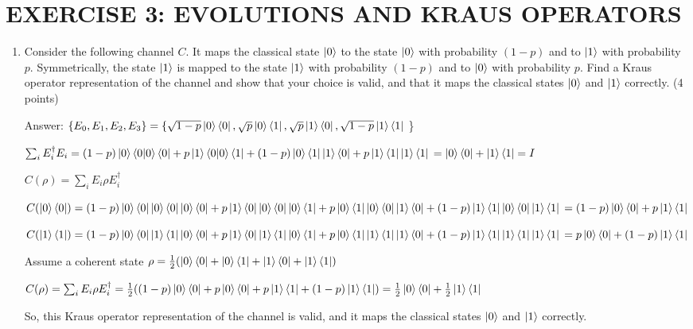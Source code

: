 \documentclass{article}
\begin{document}
\section{EXERCISE 3: EVOLUTIONS AND KRAUS OPERATORS}
\begin{enumerate}
    \item Consider the following channel $C$. It maps the classical state $\ket{0}$ to the state $\ket{0}$ with probability $(1-p)$ and to $\ket{1}$ with probability $p$. Symmetrically, the state $\ket{1}$ is mapped to the state $\ket{1}$ with probability $(1-p)$ and to $\ket{0}$ with probability $p$. Find a Kraus operator representation of the channel and show that your choice is valid, and that it maps the classical states $\ket{0}$ and $\ket{1}$ correctly. (4 points)

          Answer: $\{E_0,E_1,E_2,E_3\}=
              \{
              \sqrt{1-p}\ket{0}\bra{0}, \sqrt{p}\ket{0}\bra{1},\sqrt{p}\ket{1}\bra{0},\sqrt{1-p}\ket{1}\bra{1}$
          \}

          $\sum_i E_i^\dagger E_i=(1-p)\ket{0}\braket{0|0}\bra{0}+p\ket{1}\braket{0|0}\bra{1}+(1-p)\ket{0}\bra{1}\ket{1}\bra{0}+p\ket{1}\bra{1}\ket{1}\bra{1}
              \\=\ket{0}\bra{0}+\ket{1}\bra{1}=I$

          $C(\rho)=\sum_i E_i\rho E_i^\dagger$

          $C(\ket{0}\bra{0})=(1-p)\ket{0}\bra{0}\ket{0}\bra{0}\ket{0}\bra{0}+p\ket{1}\bra{0}\ket{0}\bra{0}\ket{0}\bra{1}+p\ket{0}\bra{1}\ket{0}\bra{0}\ket{1}\bra{0}+(1-p)\ket{1}\bra{1}\ket{0}\bra{0}\ket{1}\bra{1}
              \\=(1-p)\ket{0}\bra{0}+p\ket{1}\bra{1}$

          $C(\ket{1}\bra{1})=(1-p)\ket{0}\bra{0}\ket{1}\bra{1}\ket{0}\bra{0}+p\ket{1}\bra{0}\ket{1}\bra{1}\ket{0}\bra{1}+p\ket{0}\bra{1}\ket{1}\bra{1}\ket{1}\bra{0}+(1-p)\ket{1}\bra{1}\ket{1}\bra{1}\ket{1}\bra{1}
              \\=p\ket{0}\bra{0}+(1-p)\ket{1}\bra{1}$

          Assume a coherent state $\rho=\frac{1}{2}(\ket{0}\bra{0}+\ket{0}\bra{1}+\ket{1}\bra{0}+\ket{1}\bra{1})$

          $C(\rho)=\sum_iE_i\rho E_i^\dagger=\frac{1}{2}((1-p)\ket{0}\bra{0}+p\ket{0}\bra{0}+p\ket{1}\bra{1}+(1-p)\ket{1}\bra{1})=\frac{1}{2}\ket{0}\bra{0}+\frac{1}{2}\ket{1}\bra{1}$

          So, this Kraus operator representation of the channel is valid, and it maps the classical states $\ket{0}$ and $\ket{1}$ correctly.


\end{enumerate}
\end{document}
